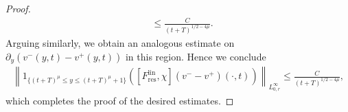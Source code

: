 \documentclass[11pt]{article}
\numberwithin{equation}{section}
\numberwithin{prop}{section}
\newcommand{\vapp}{v^\mathrm{app}}
\newcommand{\Fres}{F_\mathrm{res}}
\begin{document}
\begin{proof}
\begin{align*}
	&\leq \frac{C}{(t+T)^{1/2 - 4 \mu}}. 
	\end{align*}
	Arguing similarly, we obtain an analogous estimate on $\partial_y(v^-(y,t) - v^+(y,t))$ in this region. Hence we conclude
	\begin{align*}
	\left\|  1_{\{ (t+T)^\mu \leq y \leq (t+T)^\mu + 1 \}} \left( [F_\mathrm{res}^\mathrm{lin}, \chi] (v^- - v^+) (\cdot, t) \right) \right\|_{L^\infty_{0, r}} \leq \frac{C}{(t+T)^{1/2-4\mu}},
	\end{align*}
	which completes the proof of the desired estimates. 

\end{proof}
\end{document}
